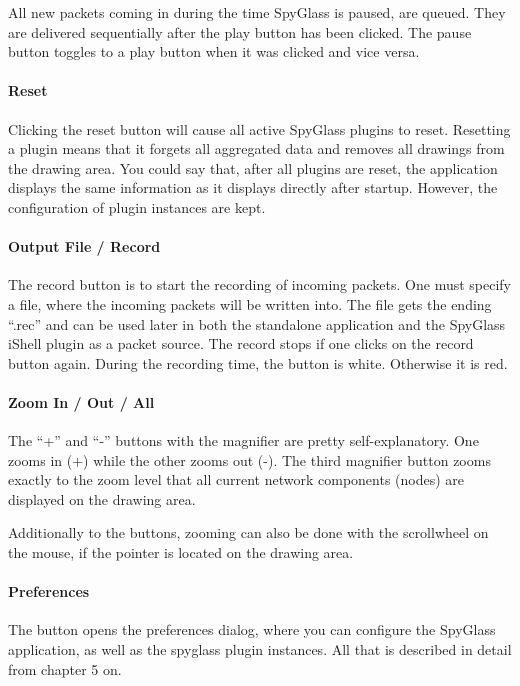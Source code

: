 		  All new packets coming in during the time SpyGlass is paused, are queued. 
		  They are delivered sequentially after the play button has been clicked. The 
		  pause button toggles to a play button when it was clicked and vice versa.
				
		\paragraph{Reset}
		  Clicking the reset button will cause all active SpyGlass plugins to reset.
		  Resetting a plugin means that it forgets all aggregated data and removes
		  all drawings from the drawing area. You could say that, after all plugins
		  are reset, the application displays the same information as it displays
		  directly after startup. However, the configuration of plugin instances are kept.
				
		\paragraph{Output File / Record}
		  The record button is to start the recording of incoming packets. One must
		  specify a file, where the incoming packets will be written into. The file gets
		  the ending “.rec” and can be used later in both the standalone application
		  and the SpyGlass iShell plugin as a packet source. The record stops if one
		  clicks on the record button again. During the recording time, the button
		  is white. Otherwise it is red.
				
		\paragraph{Zoom In / Out / All}
		  The “+” and “-” buttons with the magnifier are pretty self-explanatory.
		  One zooms in (+) while the other zooms out (-). The third magnifier button
		  zooms exactly to the zoom level that all current network components
		  (nodes) are displayed on the drawing area.
		  
		  Additionally to the buttons, zooming can also be done with the scrollwheel
		  on the mouse, if the pointer is located on the drawing area.
				
		\paragraph{Preferences}
		  The button opens the preferences dialog, where you can configure the
		  SpyGlass application, as well as the spyglass plugin instances. All that is
		  described in detail from chapter 5 on.

